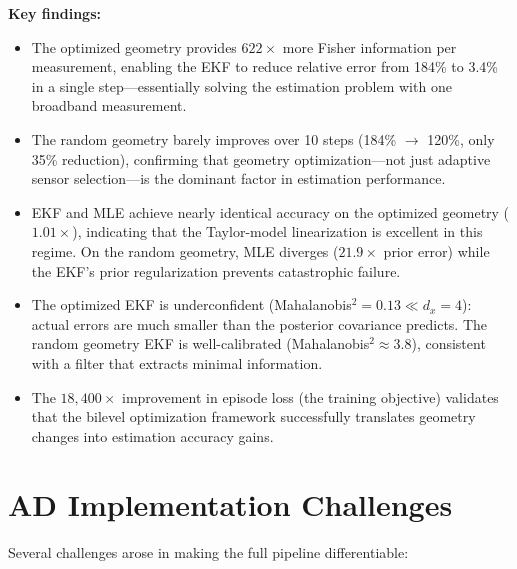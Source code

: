 \documentclass[11pt,a4paper]{article}
\begin{document}
\textbf{Key findings:}
\begin{itemize}[nosep]
  \item The optimized geometry provides $622\times$ more Fisher information per measurement, enabling the EKF to reduce relative error from 184\% to 3.4\% in a single step---essentially solving the estimation problem with one broadband measurement.
  \item The random geometry barely improves over 10 steps (184\% $\to$ 120\%, only 35\% reduction), confirming that geometry optimization---not just adaptive sensor selection---is the dominant factor in estimation performance.
  \item EKF and MLE achieve nearly identical accuracy on the optimized geometry ($1.01\times$), indicating that the Taylor-model linearization is excellent in this regime.  On the random geometry, MLE diverges ($21.9\times$ prior error) while the EKF's prior regularization prevents catastrophic failure.
  \item The optimized EKF is underconfident (Mahalanobis$^2 = 0.13 \ll d_x = 4$): actual errors are much smaller than the posterior covariance predicts.  The random geometry EKF is well-calibrated (Mahalanobis$^2 \approx 3.8$), consistent with a filter that extracts minimal information.
  \item The $18{,}400\times$ improvement in episode loss (the training objective) validates that the bilevel optimization framework successfully translates geometry changes into estimation accuracy gains.
\end{itemize}

\section{AD Implementation Challenges}

Several challenges arose in making the full pipeline differentiable:
\end{document}
